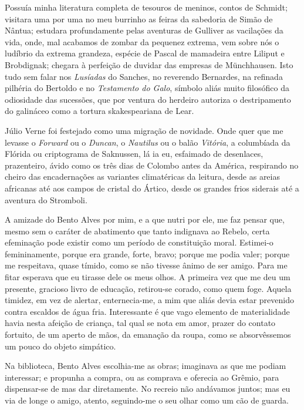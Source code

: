 Possuía minha literatura completa de tesouros de meninos, contos de
Schmidt; visitara uma por uma no meu burrinho as feiras da sabedoria de
Simão de Nântua; estudara profundamente pelas aventuras de Gulliver as
vacilações da vida, onde, mal acabamos de zombar da pequenez extrema,
vem sobre nós o ludíbrio da extrema grandeza, espécie de Pascal de
mamadeira entre Liliput e Brobdignak; chegara à perfeição de duvidar
das empresas de Münchhausen. Isto tudo sem falar nos \textit{Lusíadas} do
Sanches, no reverendo Bernardes, na refinada pilhéria do Bertoldo e no
\textit{Testamento do Galo}, símbolo aliás muito filosófico da odiosidade das
sucessões, que por ventura do herdeiro autoriza o destripamento do
galináceo como a tortura skakespeariana de Lear. 

Júlio Verne foi
festejado como uma migração de novidade. Onde quer que me levasse o
\textit{Forward} ou o \textit{Duncan}, o \textit{Nautilus} ou o balão \textit{Vitória}, a columbíada da
Flórida ou criptograma de Saknussen, lá ia eu, esfaimado de desenlaces,
prazenteiro, ávido como os três dias de Colombo antes da América,
respirando no cheiro das encadernações as variantes climatéricas da
leitura, desde as areias africanas até aos campos de cristal do Ártico,
desde os grandes frios siderais até a aventura do Stromboli. 

A amizade
do Bento Alves por mim, e a que nutri por ele, me faz pensar que, mesmo
sem o caráter de abatimento que tanto indignava ao Rebelo, certa
efeminação pode existir como um período de constituição moral.
Estimei{}-o femininamente, porque era grande, forte, bravo; porque me
podia valer; porque me respeitava, quase tímido, como se não tivesse
ânimo de ser amigo. Para me fitar esperava que eu tirasse dele os meus
olhos. A primeira vez que me deu um presente, gracioso livro de
educação, retirou{}-se corado, como quem foge. Aquela timidez, em vez
de alertar, enternecia{}-me, a mim que aliás devia estar prevenido
contra escaldos de água fria. Interessante é que vago elemento de
materialidade havia nesta afeição de criança, tal qual se nota em amor,
prazer do contato fortuito, de um aperto de mãos, da emanação da roupa,
como se absorvêssemos um pouco do objeto simpático. 

Na biblioteca,
Bento Alves escolhia{}-me as obras; imaginava as que me podiam
interessar; e propunha a compra, ou as comprava e oferecia ao Grêmio,
para dispensar{}-se de mas dar diretamente. No recreio não andávamos
juntos; mas eu via de longe o amigo, atento, seguindo{}-me o seu olhar
como um cão de guarda. 

